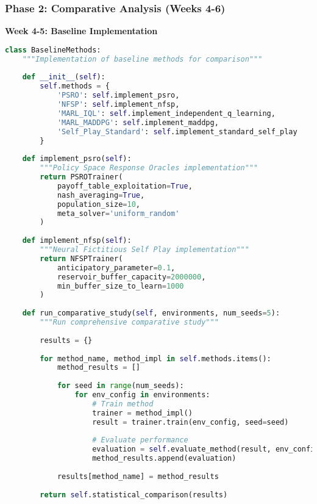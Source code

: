 \documentclass[12pt,a4paper]{article}
\begin{document}
\subsubsection{Phase 2: Comparative Analysis (Weeks 4-6)}

\textbf{Week 4-5: Baseline Implementation}
\begin{lstlisting}[language=Python, caption=Baseline Methods Implementation]
class BaselineMethods:
    """Implementation of baseline methods for comparison"""
    
    def __init__(self):
        self.methods = {
            'PSRO': self.implement_psro,
            'NFSP': self.implement_nfsp,
            'MARL_IQL': self.implement_independent_q_learning,
            'MARL_MADDPG': self.implement_maddpg,
            'Self_Play_Standard': self.implement_standard_self_play
        }
    
    def implement_psro(self):
        """Policy Space Response Oracles implementation"""
        return PSROTrainer(
            payoff_table_exploitation=True,
            nash_averaging=True,
            population_size=10,
            meta_solver='uniform_random'
        )
    
    def implement_nfsp(self):
        """Neural Fictitious Self Play implementation"""
        return NFSPTrainer(
            anticipatory_parameter=0.1,
            reservoir_buffer_capacity=2000000,
            min_buffer_size_to_learn=1000
        )
    
    def run_comparative_study(self, environments, num_seeds=5):
        """Run comprehensive comparative study"""
        
        results = {}
        
        for method_name, method_impl in self.methods.items():
            method_results = []
            
            for seed in range(num_seeds):
                for env_config in environments:
                    # Train method
                    trainer = method_impl()
                    result = trainer.train(env_config, seed=seed)
                    
                    # Evaluate performance
                    evaluation = self.evaluate_method(result, env_config)
                    method_results.append(evaluation)
            
            results[method_name] = method_results
        
        return self.statistical_comparison(results)
    

\end{lstlisting}
\end{document}
